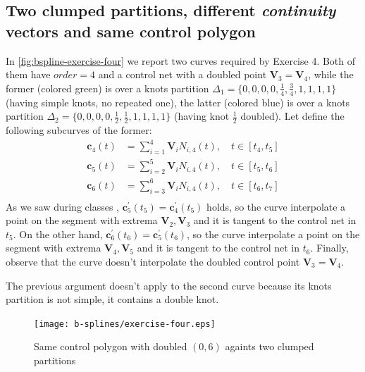 \documentclass{article}
\begin{document}
\subsection{Two clumped partitions, different \emph{continuity} vectors
    and same control polygon}
In \autoref{fig:bspline-exercise-four} we report two curves required by Exercise 4.
Both of them have $order = 4$ and a control net with a doubled point
$\mathbf{V}_{3} = \mathbf{V}_{4}$, while the former (colored green)
is over a knots partition
$\Delta_{1} = \lbrace 0,0,0,0,\frac{1}{4}, \frac{3}{4}, 1,1,1,1 \rbrace$
(having simple knots, no repeated one), the latter (colored blue) is over
a knots partition
$\Delta_{2} = \lbrace 0,0,0,0,\frac{1}{2}, \frac{1}{2}, 1,1,1,1 \rbrace$ (having
knot $\frac{1}{2}$ doubled). Let define the following subcurves of the former:
\begin{displaymath}
    \begin{split}
        \mathbf{c}_{4}(t) &= \sum_{i=1}^{4}{\mathbf{V}_{i}N_{i,4}(t)}, \quad
            t \in [t_{4}, t_{5}] \\
        \mathbf{c}_{5}(t) &= \sum_{i=2}^{5}{\mathbf{V}_{i}N_{i,4}(t)}, \quad
            t \in [t_{5}, t_{6}] \\
        \mathbf{c}_{6}(t) &= \sum_{i=3}^{6}{\mathbf{V}_{i}N_{i,4}(t)}, \quad
            t \in [t_{6}, t_{7}] \\
    \end{split}
\end{displaymath}
As we saw during classes \cite{Conti}, $\mathbf{c}_{5}^{\prime}(t_{5}) =
\mathbf{c}_{4}^{\prime}(t_{5})$ holds, so the
curve interpolate a point on the segment with extrema $\mathbf{V}_{2}, \mathbf{V}_{3}$
and it is tangent to the control net in $t_{5}$. On the other hand,
$\mathbf{c}_{6}^{\prime}(t_{6}) = \mathbf{c}_{5}^{\prime}(t_{6})$, so the
curve interpolate a point on the segment with extrema $\mathbf{V}_{4}, \mathbf{V}_{5}$
and it is tangent to the control net in $t_{6}$.
Finally, observe that the curve doesn't
interpolate the doubled control point $\mathbf{V}_{3} = \mathbf{V}_{4}$.

The previous argument doesn't apply to the second curve because its
knots partition is not simple, it contains a double knot.

\begin{figure}[h!]
  \centering
  \texttt{[image: b-splines/exercise-four.eps]}
  \caption{Same control polygon with doubled $(0,6)$ againts two clumped partitions}
  \label{fig:bspline-exercise-four}
\end{figure}
\end{document}
